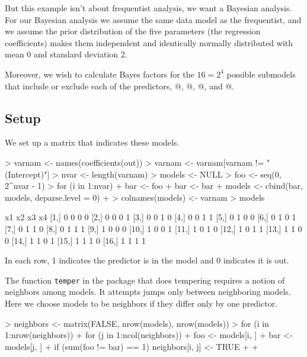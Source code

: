 \documentclass[11pt]{article}
\begin{document}
But this example isn't about frequentist analysis, we want a Bayesian
analysis.  For our Bayesian analysis we assume the same data model as the
frequentist, and we assume the prior distribution of the five parameters
(the regression coefficients) makes them independent and identically
normally distributed with mean 0 and standard deviation 2.

Moreover, we wish to calculate Bayes factors for the $16 = 2^4$ possible
submodels that include or exclude each of the
predictors, @, @, @, and @.

\subsection{Setup}

We set up a matrix that indicates these models.
\begin{Schunk}
\begin{Sinput}
> varnam <- names(coefficients(out))
> varnam <- varnam[varnam != "(Intercept)"]
> nvar <- length(varnam)
> models <- NULL
> foo <- seq(0, 2^nvar - 1) 
> for (i in 1:nvar) {
+     bar <- foo %/% 2^(i - 1)
+     bar <- bar %% 2
+     models <- cbind(bar, models, deparse.level = 0)
+ }
> colnames(models) <- varnam
> models
\end{Sinput}
\begin{Soutput}
      x1 x2 x3 x4
 [1,]  0  0  0  0
 [2,]  0  0  0  1
 [3,]  0  0  1  0
 [4,]  0  0  1  1
 [5,]  0  1  0  0
 [6,]  0  1  0  1
 [7,]  0  1  1  0
 [8,]  0  1  1  1
 [9,]  1  0  0  0
[10,]  1  0  0  1
[11,]  1  0  1  0
[12,]  1  0  1  1
[13,]  1  1  0  0
[14,]  1  1  0  1
[15,]  1  1  1  0
[16,]  1  1  1  1
\end{Soutput}
\end{Schunk}
In each row, 1 indicates the predictor is in the model and 0 indicates it is
out.

The function \texttt{temper} in the  package that does tempering
requires a notion of neighbors among models.  It attempts jumps only between
neighboring models.  Here we choose models to be neighbors if they differ
only by one predictor.
\begin{Schunk}
\begin{Sinput}
> neighbors <- matrix(FALSE, nrow(models), nrow(models))
> for (i in 1:nrow(neighbors)) {
+     for (j in 1:ncol(neighbors)) {
+         foo <- models[i, ]
+         bar <- models[j, ]
+         if (sum(foo != bar) == 1) neighbors[i, j] <- TRUE
+     }
+ }
\end{Sinput}
\end{Schunk}
\end{document}
